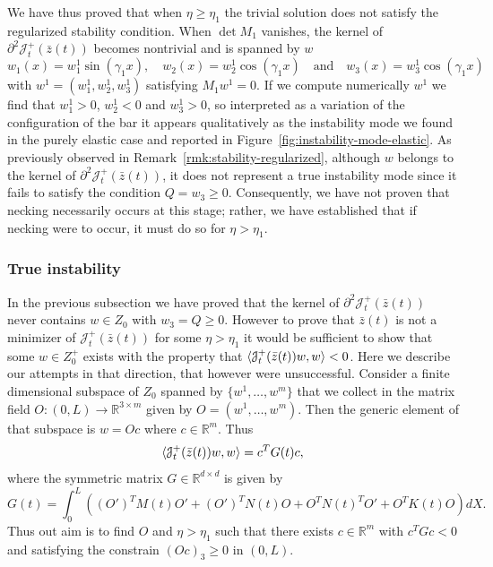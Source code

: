 \documentclass[a4paper,10pt,oneside]{amsbook}
\numberwithin{section}{chapter}
\numberwithin{equation}{chapter}
\theoremstyle{definition}
\DeclarePairedDelimiter{\dual}{\langle}{\rangle}
\begin{document}
We have thus proved that when $\eta\ge\eta_1$ the trivial solution does not satisfy the regularized stability condition. When $\det M_1$ vanishes, the kernel of $\partial^2\mathcal{J}^+_t(\bar z(t))$ becomes nontrivial and is spanned by $w$
\[
w_1(x)=w_1^1\sin(\gamma_1x),\quad w_2(x)=w_2^1\cos(\gamma_1x)\quad\text{and}\quad w_3(x)=w_3^1\cos(\gamma_1x)
\]
with $w^1=(w^1_1,w^1_2,w^1_3)$ satisfying $M_1w^1=0$. If we compute numerically $w^1$ we find that $w^1_1>0$, $w^1_2<0$ and $w^1_3>0$, so interpreted as a variation of the configuration of the bar it appears qualitatively as the instability mode we found in the purely elastic case and reported in Figure~\ref{fig:instability-mode-elastic}. As previously observed in Remark~\ref{rmk:stability-regularized}, although $w$ belongs to the kernel of $\partial^2\mathcal{J}_t^+(\bar{z}(t))$, it does not represent a true instability mode since it fails to satisfy the condition $Q=w_3\ge0$. Consequently, we have not proven that necking necessarily occurs at this stage; rather, we have established that if necking were to occur, it must do so for $\eta>\eta_1$.


\subsubsection*{True instability} In the previous subsection we have proved that the kernel of $\partial^2\mathcal{J}^+_t(\bar{z}(t))$ never contains $w\in Z_0$ with $w_3=Q\ge 0$. However to prove that $\bar{z}(t)$ is not a minimizer of $\mathcal{J}^+_t(\bar{z}(t))$ for some $\eta>\eta_1$ it would be sufficient to show that some $w\in Z_0^+$ exists with the property that $\dual{\mathcal{J}^+_t(\bar{z}(t))w,w}<0$. Here we describe our attempts in that direction, that however were unsuccessful. Consider a finite dimensional subspace of $Z_0$ spanned by $\{w^1,\dots,w^m\}$ that we collect in the matrix field $O\colon(0,L)\to\mathbb{R}^{3\times m}$ given by $O=(w^1,\dots,w^m)$. Then the generic element of that subspace is $w=Oc$ where $c\in\mathbb{R}^m$. Thus
\[
\dual{\mathcal{J}^+_t(\bar{z}(t))w,w}=c^TG(t)c,
\]
where the symmetric matrix $G\in\mathbb{R}^{d\times d}$ is given by
\[
G(t)=\int_0^L\left((O')^TM(t)O'+(O')^TN(t)O+O^TN(t)^TO'+O^TK(t)O\right)dX.
\]
Thus out aim is to find $O$ and $\eta>\eta_1$ such that there exists $c\in\mathbb{R}^{m}$ with $c^TGc<0$ and satisfying the constrain $(Oc)_3\ge0$ in $(0,L)$.
\end{document}
